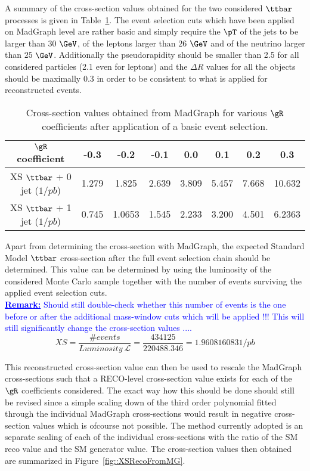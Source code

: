 A summary of the cross-section values obtained for the two considered $\ttbar$ processes is given in Table~\ref{table::MGXS_ttbarCut}. The event selection cuts which have been applied on MadGraph level are rather basic and simply require the $\pT$ of the jets to be larger than $30$ $\GeV$, of the leptons larger than $26$ $\GeV$ and of the neutrino larger than $25$ $\GeV$. Additionally the pseudorapidity should be smaller than 2.5 for all considered particles (2.1 even for leptons) and the $\Delta R$ values for all the objects should be maximally 0.3 in order to be consistent to what is applied for reconstructed events.
\begin{table}[h!t]
 \caption{Cross-section values obtained from MadGraph for various $\gR$ coefficients after application of a basic event selection.} \label{table::MGXS_ttbarCut}
 \centering
 \begin{tabular}{|c||c|c|c|c|c|c|c|}
  \hline
  $\gR$ coefficient 		& -0.3 		& -0.2 		& -0.1 		& 0.0 		& 0.1 		& 0.2 		& 0.3 		\\
  \hline
  XS $\ttbar$ + 0 jet ($1/pb$) 	& 1.279 	& 1.825 	& 2.639 	& 3.809 	& 5.457 	& 7.668 	& 10.632 	\\
  XS $\ttbar$ + 1 jet ($1/pb$) 	& 0.745 	& 1.0653 	& 1.545 	& 2.233 	& 3.200 	& 4.501 	& 6.2363 	\\
  \hline
 \end{tabular}
\end{table}

Apart from determining the cross-section with MadGraph, the expected Standard Model $\ttbar$ cross-section after the full event selection chain should be determined. This value can be determined by using the luminosity of the considered Monte Carlo sample together with the number of events surviving the applied event selection cuts.\\
\textcolor{blue}{\textbf{\underline{Remark:}} Should still double-check whether this number of events is the one before or after the additional mass-window cuts which will be applied !!! This will still significantly change the cross-section values ....}\\
\begin{equation}
 XS = \frac{\# events}{Luminosity ~ \mathcal{L}} = \frac{434125}{220488.346} = 1.960816083 1/pb
\end{equation}

This reconstructed cross-section value can then be used to rescale the MadGraph cross-sections such that a RECO-level cross-section value exists for each of the $\gR$ coefficients considered.
The exact way how this should be done should still be revised since a simple scaling down of the third order polynomial fitted through the individual MadGraph cross-sections would result in negative cross-section values which is ofcourse not possible. The method currently adopted is an separate scaling of each of the individual cross-sections with the ratio of the SM reco value and the SM generator value. The cross-section values then obtained are summarized in Figure~\ref{fig::XSRecoFromMG}.

